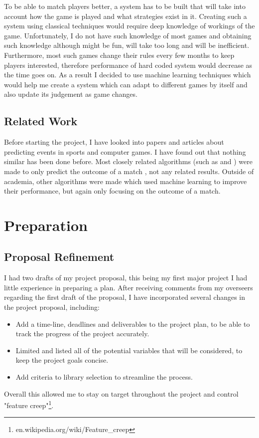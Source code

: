 \documentclass[12pt,a4paper]{book}
\begin{document}
To be able to match players better, a system has to be built that will take into account how the game is played and what strategies exist in it.
Creating such a system using classical techniques would require deep knowledge of workings of the game.
Unfortunately, I do not have such knowledge of most games and obtaining such knowledge although might be fun, will take too long and will be inefficient.
Furthermore, most such games change their rules every few months to keep players interested, therefore performance of hard coded system would decrease as the time goes on.
As a result I decided to use machine learning techniques which would help me create a system which can adapt to different games by itself and also update its judgement as game changes.

\section{Related Work}
Before starting the project, I have looked into papers and articles about predicting events in sports and computer games.
I have found out that nothing similar has been done before.
Most closely related algorithms (such as \cite{trueskill} and \cite{bayesianranking}) were made to only predict the outcome of a match , not any related results.
Outside of academia, other algorithms were made which used machine learning to improve their performance, but again only focusing on the outcome of a match.


\chapter{Preparation}
\section{Proposal Refinement}
I had two drafts of my project proposal, this being my first major project I had little experience in preparing a plan.
After receiving comments from my overseers regarding the first draft of the proposal, I have incorporated several changes in the project proposal, including:
\begin{itemize}
\item Add a time-line, deadlines and deliverables to the project plan, to be able to track the progress of the project accurately.
\item Limited and listed all of the potential variables that will be considered, to keep the project goals concise.
\item Add criteria to library selection to streamline the process.
\end{itemize}
Overall this allowed me to stay on target throughout the project and control "feature creep"\footnote{en.wikipedia.org/wiki/Feature\_creep}.
\end{document}
